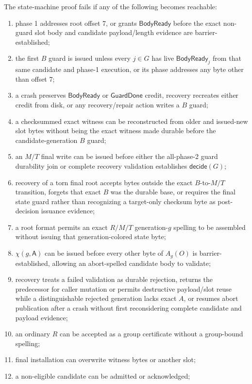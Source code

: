 \documentclass[10pt,twocolumn]{article}
\theoremstyle{remark}
\newcommand{\Abort}{\mathsf{A}}
\begin{document}
The state-machine proof fails if any of the following becomes reachable:
\begin{enumerate}
  \item phase 1 addresses root offset 7, or grants $\mathsf{BodyReady}$ before the exact non-guard
  slot body and candidate payload/length evidence are barrier-established;
  \item the first $B$ guard is issued unless every $j\in G$ has live $\mathsf{BodyReady}_j$ from
  that same candidate and phase-1 execution, or its phase addresses any byte other than offset 7;
  \item a crash preserves $\mathsf{BodyReady}$ or $\mathsf{GuardDone}$ credit, recovery recreates
  either credit from disk, or any recovery/repair action writes a $B$ guard;
  \item a checksummed exact witness can be reconstructed from older and issued-new slot bytes without
  being the exact witness made durable before the candidate-generation $B$ guard;
  \item an $M/T$ final write can be issued before either the all-phase-2 guard durability join or complete
  recovery validation establishes $\mathsf{decide}(G)$;
  \item recovery of a torn final root accepts bytes outside the exact $B$-to-$M/T$ transition,
  forgets that exact $B$ was the durable base, or requires the final state guard rather than
  recognizing a target-only checksum byte as post-decision issuance evidence;
  \item a root format permits an exact $R/M/T$ generation-$g$ spelling to be assembled without
  issuing that generation-colored state byte;
  \item $\chi(g,\Abort)$ can be issued before every other byte of $A_g(O)$ is barrier-established,
  allowing an abort-spelled candidate body to validate;
  \item recovery treats a failed validation as durable rejection, returns the predecessor for caller
  mutation or permits destructive payload/slot reuse while a distinguishable rejected generation
  lacks exact $A$, or resumes abort publication after a
  crash without first reconsidering complete candidate and payload evidence;
  \item an ordinary $R$ can be accepted as a group certificate without a group-bound spelling;
  \item final installation can overwrite witness bytes or another slot;
  \item a non-eligible candidate can be admitted or acknowledged;

\end{enumerate}
\end{document}
